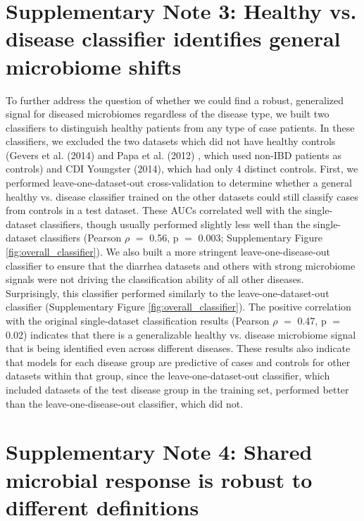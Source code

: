 \documentclass{article}
\begin{document}
{\section*{Supplementary Note 3: Healthy vs. disease classifier identifies general microbiome shifts}\label{sec:overall_classifier}

To further address the question of whether we could find a robust, generalized signal for diseased microbiomes regardless of the disease type, we built two classifiers to distinguish healthy patients from any type of case patients. 
In these classifiers, we excluded the two datasets which did not have healthy controls (Gevers et al. (2014) \cite{ibd-gevers}  and Papa et al. (2012) \cite{ibd-papa}, which used non-IBD patients as controls) and CDI Youngster (2014), \cite{cdi-youngster} which had only 4 distinct controls. 
First, we performed leave-one-dataset-out cross-validation to determine whether a general healthy vs. disease classifier trained on the other datasets could still classify cases from controls in a test dataset. 
These AUCs correlated well with the single-dataset classifiers, though usually performed slightly less well than the single-dataset classifiers (Pearson $\rho$ $=$ 0.56, p $=$ 0.003; Supplementary Figure \ref{fig:overall_classifier}). 
We also built a more stringent leave-one-disease-out classifier to ensure that the diarrhea datasets and others with strong microbiome signals were not driving the classification ability of all other diseases. 
Surprisingly, this classifier performed similarly to the leave-one-dataset-out classifier  (Supplementary Figure \ref{fig:overall_classifier}). 
The positive correlation with the original single-dataset classification results (Pearson $\rho$ $=$ 0.47, p $=$ 0.02) indicates that there is a generalizable healthy vs. disease microbiome signal that is being identified even across different diseases. 
These results also indicate that models for each disease group are predictive of cases and controls for other datasets within that group, since the leave-one-dataset-out classifier, which included datasets of the test disease group in the training set, performed better than the leave-one-disease-out classifier, which did not. 

\section*{Supplementary Note 4: Shared microbial response is robust to different definitions}\label{sec:core_defns}

}
\end{document}
